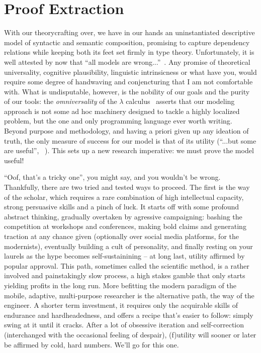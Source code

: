 \chapter{Proof Extraction}
\label{chapter:chapter_3}


With our theorycrafting over, we have in our hands an uninstantiated descriptive model of syntactic and semantic composition, promising to capture dependency relations while keeping both its feet set firmly in type theory.
Unfortunately, it is well attested by now that ``all models are wrong...''~\cite{doi:10.1080/01621459.1976.10480949}.
Any promise of theoretical universality, cognitive plausibility, linguistic intrinsicness or what have you, would require some degree of handwaving and conjencturing that I am not comfortable with.
What is undisputable, however, is the nobility of our goals and the purity of our tools: the \textit{omniversality} of the $\lambda$ calculus~\cite{wadler2015propositions} asserts that our modeling approach is not some ad hoc machinery designed to tackle a highly localized problem, but the one and only programming language ever worth writing. 
Beyond purpose and methodology, and having a priori given up any ideation of truth, the only measure of success for our model is that of its utility (``...but some are useful'', ~\cite{doi:10.1080/01621459.1976.10480949}).
This sets up a new research imperative: we must prove the model useful!

``Oof, that's a tricky one'', you might say, and you wouldn't be wrong.
Thankfully, there are two tried and tested ways to proceed.
The first is the way of the scholar, which requires a rare combination of high intellectual capacity, strong persuasive skills and a pinch of luck.
It starts off with some profound abstract thinking, gradually overtaken by agressive campaigning: bashing the competition at workshops and conferences, making bold claims and generating traction at any chance given (optionally over social media platforms, for the modernists), eventually building a cult of personality, and finally resting on your laurels as the hype becomes self-sustainining -- at long last, utility affirmed by popular approval.
This path, sometimes called the scientific method, is a rather involved and painstakingly slow process, a high stakes gamble that only starts yielding profits in the long run.
More befitting the modern paradigm of the mobile, adaptive, multi-purpose researcher is the alternative path, the way of the engineer.
A shorter term investment, it requires only the acquirable skills of endurance and hardheadedness, and offers a recipe that's easier to follow: simply swing at it until it cracks.
After a lot of obsessive iteration and self-correction (interchanged with the occasional feeling of despair), (f)utility will sooner or later be affirmed by cold, hard numbers.
We'll go for this one.

